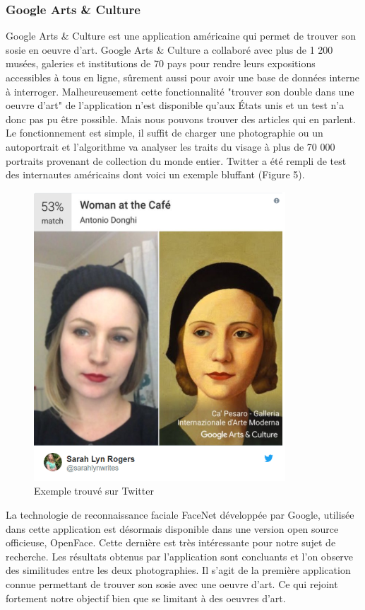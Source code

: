\documentclass[a4paper,12pt]{article}
\begin{document}
\subsubsection{Google Arts \& Culture}
Google Arts \& Culture est une application américaine qui permet de trouver son sosie en oeuvre d’art. Google Arts \& Culture a collaboré avec plus de 1 200 musées, galeries et institutions de 70 pays pour rendre leurs expositions accessibles à tous en ligne, sûrement aussi pour avoir une base de données interne à interroger. Malheureusement cette fonctionnalité "trouver son double dans une oeuvre d'art" de l'application n'est disponible qu'aux États unis et un test n'a donc pas pu être possible. Mais nous pouvons trouver des articles qui en parlent. Le fonctionnement est simple, il suffit de charger une photographie ou un autoportrait et l'algorithme va analyser les traits du visage à plus de 70 000 portraits provenant de collection du monde entier. Twitter a été rempli de test des internautes américains dont voici un exemple bluffant (Figure 5).
\begin{figure}[!ht]
    \centering
        \includegraphics[scale=1]{images/GAC.PNG}
        \caption{Exemple trouvé sur Twitter}
    \end{figure}

La technologie de reconnaissance faciale FaceNet développée par Google, utilisée dans cette application est désormais disponible dans une version open source officieuse, OpenFace. Cette dernière est très intéressante pour notre sujet de recherche. Les résultats obtenus par l'application sont concluants et l'on observe des similitudes entre les deux photographies. Il s'agit de la première application connue permettant de trouver son sosie avec une oeuvre d'art. Ce qui rejoint fortement notre objectif bien que se limitant à des oeuvres d'art.  
\end{document}
